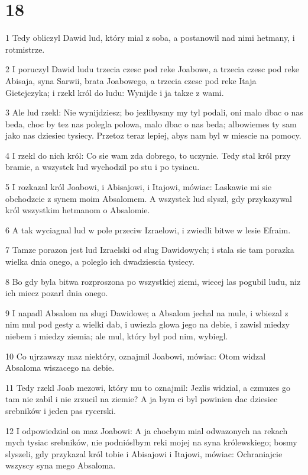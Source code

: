 \chapter{18}

\par 1 Tedy obliczyl Dawid lud, który mial z soba, a postanowil nad nimi hetmany, i rotmistrze.
\par 2 I poruczyl Dawid ludu trzecia czesc pod reke Joabowe, a trzecia czesc pod reke Abisaja, syna Sarwii, brata Joabowego, a trzecia czesc pod reke Itaja Gietejczyka; i rzekl król do ludu: Wynijde i ja takze z wami.
\par 3 Ale lud rzekl: Nie wynijdziesz; bo jezlibysmy my tyl podali, oni malo dbac o nas beda, choc by tez nas polegla polowa, malo dbac o nas beda; albowiemes ty sam jako nas dziesiec tysiecy. Przetoz teraz lepiej, abys nam byl w miescie na pomocy.
\par 4 I rzekl do nich król: Co sie wam zda dobrego, to uczynie. Tedy stal król przy bramie, a wszystek lud wychodzil po stu i po tysiacu.
\par 5 I rozkazal król Joabowi, i Abisajowi, i Itajowi, mówiac: Laskawie mi sie obchodzcie z synem moim Absalomem. A wszystek lud slyszl, gdy przykazywal król wszystkim hetmanom o Absalomie.
\par 6 A tak wyciagnal lud w pole przeciw Izraelowi, i zwiedli bitwe w lesie Efraim.
\par 7 Tamze porazon jest lud Izraelski od slug Dawidowych; i stala sie tam porazka wielka dnia onego, a poleglo ich dwadziescia tysiecy.
\par 8 Bo gdy byla bitwa rozproszona po wszystkiej ziemi, wiecej las pogubil ludu, niz ich miecz pozarl dnia onego.
\par 9 I napadl Absalom na slugi Dawidowe; a Absalom jechal na mule, i wbiezal z nim mul pod gesty a wielki dab, i uwiezla glowa jego na debie, i zawisl miedzy niebem i miedzy ziemia; ale mul, który byl pod nim, wybiegl.
\par 10 Co ujrzawszy maz niektóry, oznajmil Joabowi, mówiac: Otom widzal Absaloma wiszacego na debie.
\par 11 Tedy rzekl Joab mezowi, który mu to oznajmil: Jezlis widzial, a czmuzes go tam nie zabil i nie zrzucil na ziemie? A ja bym ci byl powinien dac dziesiec srebników i jeden pas rycerski.
\par 12 I odpowiedzial on maz Joabowi: A ja chocbym mial odwazonych na rekach mych tysiac srebników, nie podnióslbym reki mojej na syna królewskiego; bosmy slyszeli, gdy przykazal król tobie i Abisajowi i Itajowi, mówiac: Ochraniajcie wszyscy syna mego Absaloma.
